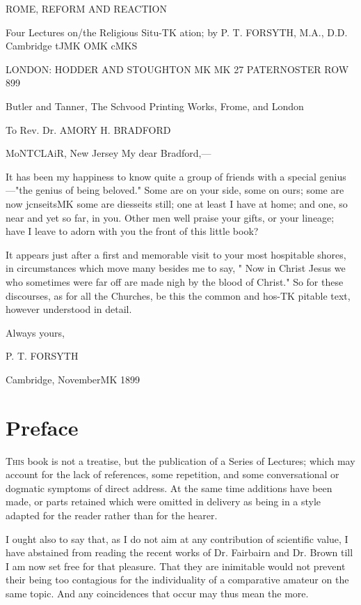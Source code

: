 \documentclass[12pt,a5paper,oneside]{book}
\begin{document}
ROME, REFORM 
AND REACTION 



Four Lectures on/the Religious Situ-TK
ation; by P. T. FORSYTH, M.A., D.D. 
Cambridge tJMK OMK cMKS 



LONDON: HODDER AND 
STOUGHTON MK MK 27 
PATERNOSTER ROW 899 



Butler and Tanner, The Schvood Printing Works, Frome, and London 



To 
Rev. Dr. AMORY H. BRADFORD 

MoNTCLAiR, New Jersey 
My dear Bradford,---

It has been my happiness to know quite a 
group of friends with a special genius---"the genius 
of being beloved." Some are on your side, some on 
ours; some are now jcnseitsMK some are diesseits still; 
one at least I have at home; and one, so near and 
yet so far, in you. Other men well praise your gifts, 
or your lineage; have I leave to adorn with you the 
front of this little book? 

It appears just after a first and memorable visit to 
your most hospitable shores, in circumstances which 
move many besides me to say, " Now in Christ 
Jesus we who sometimes were far off are made nigh 
by the blood of Christ." So for these discourses, as 
for all the Churches, be this the common and hos-TK
pitable text, however understood in detail. 

Always yours, 

P. T. FORSYTH 

Cambridge, NovemberMK 1899 



\chapter*{Preface} 

\textsc{This} book is not a treatise, but the publication 
of a Series of Lectures; which may account 
for the lack of references, some repetition, 
and some conversational or dogmatic 
symptoms of direct address. At the same time 
additions have been made, or parts retained 
which were omitted in delivery as being in 
a style adapted for the reader rather than for 
the hearer. 

I ought also to say that, as I do not aim 
at any contribution of scientific value, I have 
abstained from reading the recent works of 
Dr. Fairbairn and Dr. Brown till I am now 
set free for that pleasure. That they are 
inimitable would not prevent their being too 
contagious for the individuality of a comparative 
amateur on the same topic. And any 
coincidences that occur may thus mean the 
more. 
\end{document}
